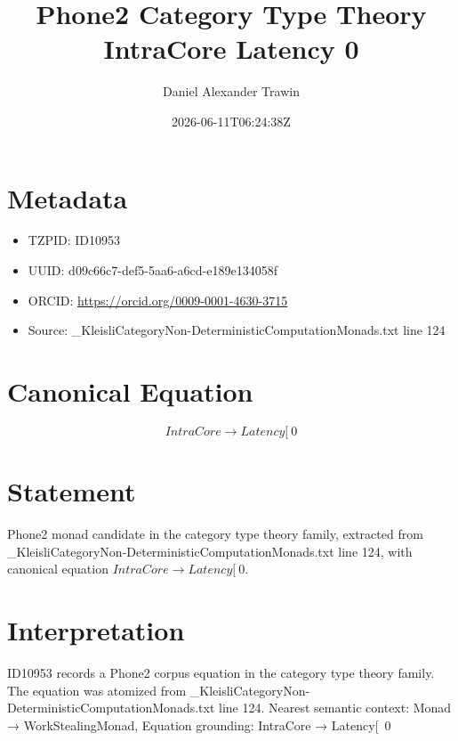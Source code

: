 \documentclass[11pt]{article}
\title{Phone2 Category Type Theory IntraCore Latency 0}
\author{Daniel Alexander Trawin}
\date{2026-06-11T06:24:38Z}
\begin{document}
\maketitle
\section*{Metadata}
\begin{itemize}
\item TZPID: ID10953
\item UUID: d09c66c7-def5-5aa6-a6cd-e189e134058f
\item ORCID: \url{https://orcid.org/0009-0001-4630-3715}
\item Source: _KleisliCategoryNon-DeterministicComputationMonads.txt line 124
\end{itemize}
\section*{Canonical Equation}
\[
IntraCore → Latency[~0
\]
\section*{Statement}
Phone2 monad candidate in the category type theory family, extracted from _KleisliCategoryNon-DeterministicComputationMonads.txt line 124, with canonical equation $IntraCore → Latency[~0$.
\section*{Interpretation}
ID10953 records a Phone2 corpus equation in the category type theory family. The equation was atomized from _KleisliCategoryNon-DeterministicComputationMonads.txt line 124. Nearest semantic context: Monad → WorkStealingMonad, Equation grounding: IntraCore → Latency[~0
\end{document}
